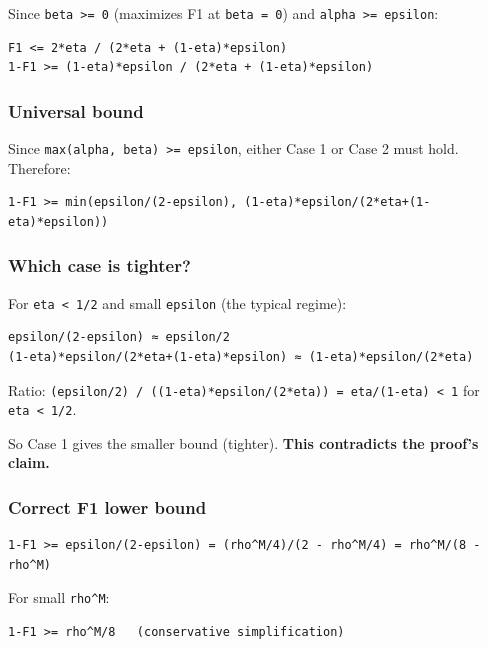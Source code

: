 \documentclass[
  12pt,
]{ctexart}
\begin{document}
Since \texttt{beta\ \textgreater{}=\ 0} (maximizes F1 at
\texttt{beta\ =\ 0}) and \texttt{alpha\ \textgreater{}=\ epsilon}:

\begin{verbatim}
F1 <= 2*eta / (2*eta + (1-eta)*epsilon)
1-F1 >= (1-eta)*epsilon / (2*eta + (1-eta)*epsilon)
\end{verbatim}

\subsubsection{Universal bound}\label{universal-bound}

Since \texttt{max(alpha,\ beta)\ \textgreater{}=\ epsilon}, either Case
1 or Case 2 must hold. Therefore:

\begin{verbatim}
1-F1 >= min(epsilon/(2-epsilon), (1-eta)*epsilon/(2*eta+(1-eta)*epsilon))
\end{verbatim}

\subsubsection{Which case is tighter?}\label{which-case-is-tighter}

For \texttt{eta\ \textless{}\ 1/2} and small \texttt{epsilon} (the
typical regime):

\begin{verbatim}
epsilon/(2-epsilon) ≈ epsilon/2
(1-eta)*epsilon/(2*eta+(1-eta)*epsilon) ≈ (1-eta)*epsilon/(2*eta)
\end{verbatim}

Ratio:
\texttt{(epsilon/2)\ /\ ((1-eta)*epsilon/(2*eta))\ =\ eta/(1-eta)\ \textless{}\ 1}
for \texttt{eta\ \textless{}\ 1/2}.

So Case 1 gives the smaller bound (tighter). \textbf{This contradicts
the proof's claim.}

\subsubsection{Correct F1 lower bound}\label{correct-f1-lower-bound}

\begin{verbatim}
1-F1 >= epsilon/(2-epsilon) = (rho^M/4)/(2 - rho^M/4) = rho^M/(8 - rho^M)
\end{verbatim}

For small \texttt{rho\^{}M}:

\begin{verbatim}
1-F1 >= rho^M/8   (conservative simplification)
\end{verbatim}
\end{document}
